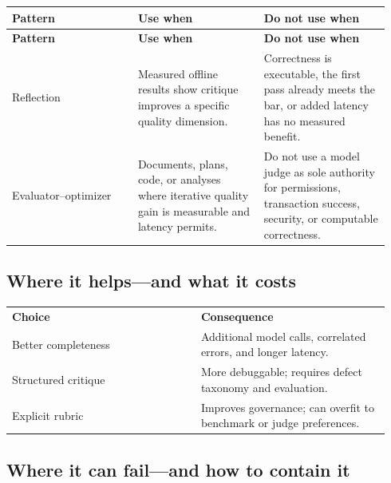 \BookTableStart
\small
\begin{longtable}{@{}Y{0.3133\linewidth}Y{0.3133\linewidth}Y{0.3133\linewidth}@{}}
\color{white}\bfseries \textbf{Pattern} & \color{white}\bfseries \textbf{Use when} & \color{white}\bfseries \textbf{Do not use when} \\
\endfirsthead
{}
\color{white}\bfseries \textbf{Pattern} & \color{white}\bfseries \textbf{Use when} & \color{white}\bfseries \textbf{Do not use when} \\
\endhead
Reflection & Measured offline results show critique improves a specific quality dimension. & Correctness is executable, the first pass already meets the bar, or added latency has no measured benefit. \\
Evaluator–optimizer & Documents, plans, code, or analyses where iterative quality gain is measurable and latency permits. & Do not use a model judge as sole authority for permissions, transaction success, security, or computable correctness. \\
\end{longtable}
\BookTableEnd

\subsection{Where it helps—and what it costs}

\BookTableStart
\small
\begin{tabular}{@{}Y{0.4700\linewidth}Y{0.4700\linewidth}@{}}
\color{white}\bfseries \textbf{Choice} & \color{white}\bfseries \textbf{Consequence} \\
Better completeness & Additional model calls, correlated errors, and longer latency. \\
Structured critique & More debuggable; requires defect taxonomy and evaluation. \\
Explicit rubric & Improves governance; can overfit to benchmark or judge preferences. \\
\end{tabular}
\BookTableEnd

\subsection{Where it can fail—and how to contain it}

